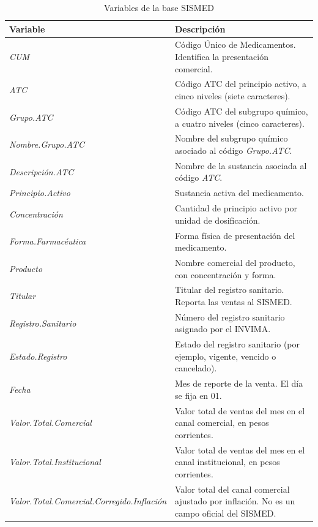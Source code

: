 \documentclass[10pt,twoside,xcolor=table,x11anmes]{IEEEtran}
\begin{document}
\begin{table}[!t]
\caption{Variables de la base SISMED}\label{tab:sismed}
\centering
\footnotesize
\renewcommand{\arraystretch}{1.15}
\begin{tabular}{>{\raggedright\arraybackslash}p{} >{\raggedright\arraybackslash}p{}}
\toprule
\textbf{Variable} & \textbf{Descripción} \\
\midrule
\textit{CUM} & Código Único de Medicamentos. Identifica la presentación comercial. \\
\textit{ATC} & Código ATC del principio activo, a cinco niveles (siete caracteres). \\
\textit{Grupo.\allowbreak ATC} & Código ATC del subgrupo químico, a cuatro niveles (cinco caracteres). \\
\textit{Nombre.\allowbreak Grupo.\allowbreak ATC} & Nombre del subgrupo químico asociado al código \textit{Grupo.ATC}. \\
\textit{Descripción.\allowbreak ATC} & Nombre de la sustancia asociada al código \textit{ATC}. \\
\textit{Principio.\allowbreak Activo} & Sustancia activa del medicamento. \\
\textit{Concentración} & Cantidad de principio activo por unidad de dosificación. \\
\textit{Forma.\allowbreak Farmacéutica} & Forma física de presentación del medicamento. \\
\textit{Producto} & Nombre comercial del producto, con concentración y forma. \\
\textit{Titular} & Titular del registro sanitario. Reporta las ventas al SISMED. \\
\textit{Registro.\allowbreak Sanitario} & Número del registro sanitario asignado por el INVIMA. \\
\textit{Estado.\allowbreak Registro} & Estado del registro sanitario (por ejemplo, vigente, vencido o cancelado). \\
\textit{Fecha} & Mes de reporte de la venta. El día se fija en 01. \\
\textit{Valor.\allowbreak Total.\allowbreak Comercial} & Valor total de ventas del mes en el canal comercial, en pesos corrientes. \\
\textit{Valor.\allowbreak Total.\allowbreak Institucional} & Valor total de ventas del mes en el canal institucional, en pesos corrientes. \\
\textit{Valor.\allowbreak Total.\allowbreak Comercial.\allowbreak Corregido.\allowbreak Inflación} & Valor total del canal comercial ajustado por inflación. No es un campo oficial del SISMED. \\

\end{tabular}
\end{table}
\end{document}
